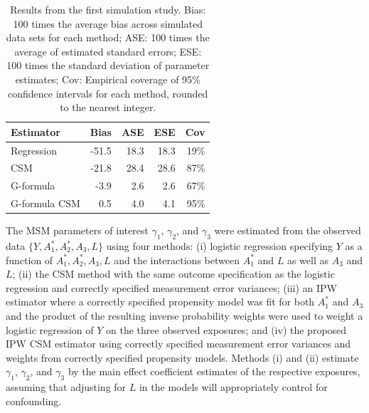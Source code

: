 \documentclass[useAMS,usenatbib,referee]{biom}
\begin{document}
\begin{table}[]
    \centering
    \caption{Results from the first simulation study. Bias: 100 times the average bias across simulated data sets for each method; ASE: 100 times the average of estimated standard errors; ESE: 100 times the standard deviation of parameter estimates; Cov: Empirical coverage of 95$\%$ confidence intervals for each method, rounded to the nearest integer.}
    \begin{tabular}{lrrrr}
    \hline
         Estimator & Bias & ASE & ESE & Cov \\
         \hline
Regression & -51.5 & 18.3 & 18.3 & 19\% \\
CSM & -21.8 & 28.4 & 28.6 & 87\% \\
G-formula & -3.9 & 2.6 & 2.6 & 67\% \\
G-formula CSM & 0.5 & 4.0 & 4.1 & 95\% \\
         \hline
    \end{tabular}
    \label{tab:one}
\end{table}

The MSM parameters of interest $\gamma_{1}$, $\gamma_{2}$, and $\gamma_{3}$ were estimated from the observed data $\{ Y, A_{1}^{*}, A_{2}^{*}, A_{3}, L \}$ using four methods: (i) logistic regression specifying $Y$ as a function of $A_{1}^{*}, A_{2}^{*}, A_{3}, L$ and the interactions between $A_{1}^{*}$ and $L$ as well as $A_{3}$ and $L$; (ii) the CSM method with the same outcome specification as the logistic regression and correctly specified measurement error variances; (iii) an IPW estimator where a correctly specified propensity model was fit for both $A_{1}^{*}$ and $A_{3}$ and the product of the resulting inverse probability weights were used to weight a logistic regression of $Y$ on the three observed exposures; and (iv) the proposed IPW CSM estimator using correctly specified measurement error variances and weights from correctly specified propensity models. Methods (i) and (ii) estimate $\gamma_{1}$, $\gamma_{2}$, and $\gamma_{3}$ by the main effect coefficient estimates of the respective exposures, assuming that adjusting for $L$ in the models will appropriately control for confounding.
\end{document}
